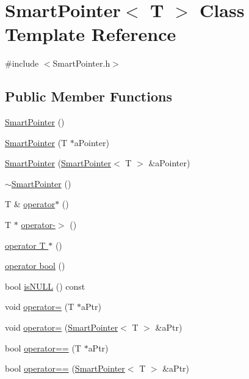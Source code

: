 \hypertarget{classSmartPointer}{}\section{Smart\+Pointer$<$ T $>$ Class Template Reference}
\label{classSmartPointer}


{\ttfamily \#include $<$Smart\+Pointer.\+h$>$}

\subsection*{Public Member Functions}
\begin{DoxyCompactItemize}
\item 
\hyperlink{classSmartPointer_a3fa3ec3cd42af91d449ee93657320a0d}{Smart\+Pointer} ()
\item 
\hyperlink{classSmartPointer_a03902e681eaf94fbf83effe8150fe726}{Smart\+Pointer} (T $\ast$a\+Pointer)
\item 
\hyperlink{classSmartPointer_ab873257d1345384ce08cc10f13632d6e}{Smart\+Pointer} (\hyperlink{classSmartPointer}{Smart\+Pointer}$<$ T $>$ \&a\+Pointer)
\item 
\hyperlink{classSmartPointer_a5cadb135f452564cdca23b6e5483adea}{$\sim$\+Smart\+Pointer} ()
\item 
T \& \hyperlink{classSmartPointer_abd4fd046847a9173e73985c17a7b128e}{operator$\ast$} ()
\item 
T $\ast$ \hyperlink{classSmartPointer_ad8cd7e0dee80d34e56611d2973940130}{operator-\/$>$} ()
\item 
\hyperlink{classSmartPointer_a38024dbc38e3cd1cc2a0b4f02087b310}{operator T $\ast$} ()
\item 
\hyperlink{classSmartPointer_ae786c268c7c2529bd452b3659ca05837}{operator bool} ()
\item 
bool \hyperlink{classSmartPointer_a6ca44009783c589e6fce8f9ede80abeb}{is\+N\+U\+LL} () const 
\item 
void \hyperlink{classSmartPointer_a4a602d362f4b8670c7751057dfba78a6}{operator=} (T $\ast$a\+Ptr)
\item 
void \hyperlink{classSmartPointer_ad68eef06b98859b1fa093f35ebb116a9}{operator=} (\hyperlink{classSmartPointer}{Smart\+Pointer}$<$ T $>$ \&a\+Ptr)
\item 
bool \hyperlink{classSmartPointer_a4442e51cefdce95924c4b13783c59602}{operator==} (T $\ast$a\+Ptr)
\item 
bool \hyperlink{classSmartPointer_ae1134ad18bd14ac4074148bfaf08c469}{operator==} (\hyperlink{classSmartPointer}{Smart\+Pointer}$<$ T $>$ \&a\+Ptr)
\end{DoxyCompactItemize}
